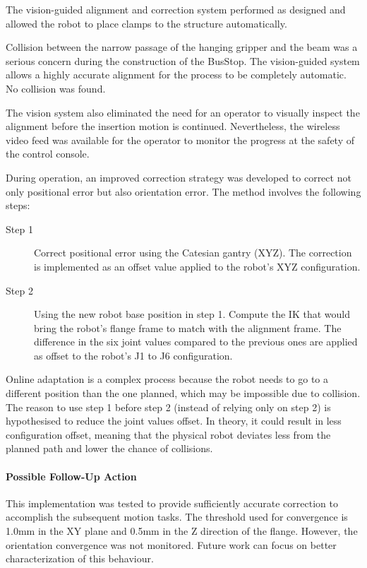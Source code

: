 The vision-guided alignment and correction system performed as designed and allowed the robot to place clamps to the structure automatically. 

Collision between the narrow passage of the hanging gripper and the beam was a serious concern during the construction of the BusStop. The vision-guided system allows a highly accurate alignment for the process to be completely automatic. No collision was found.

The vision system also eliminated the need for an operator to visually inspect the alignment before the insertion motion is continued. Nevertheless, the wireless video feed was available for the operator to monitor the progress at the safety of the control console.

During operation, an improved correction strategy was developed to correct not only positional error but also orientation error. The method involves the following steps:

\begin{description}
	\item[Step 1] Correct positional error using the Catesian gantry (XYZ). The correction is implemented as an offset value applied to the robot’s XYZ configuration.

	\item[Step 2] Using the new robot base position in step 1. Compute the IK that would bring the robot’s flange frame to match with the alignment frame. The difference in the six joint values compared to the previous ones are applied as offset to the robot’s J1 to J6 configuration.

\end{description}

Online adaptation is a complex process because the robot needs to go to a different position than the one planned, which may be impossible due to collision. The reason to use step 1 before step 2 (instead of relying only on step 2) is hypothesised to reduce the joint values offset. In theory, it could result in less configuration offset, meaning that the physical robot deviates less from the planned path and lower the chance of collisions. 

\paragraph{Possible Follow-Up Action}

This implementation was tested to provide sufficiently accurate correction to accomplish the subsequent motion tasks. The threshold used for convergence is 1.0mm in the XY plane and 0.5mm in the Z direction of the flange. However, the orientation convergence was not monitored. Future work can focus on better characterization of this behaviour. 

